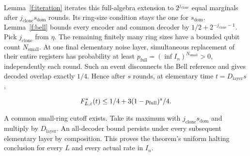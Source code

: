 Lemma~\ref{f:iteration} iterates this full-algebra extension to \(2^{j_{\mathrm{clone}}}\) equal marginals after \(j_{\mathrm{clone}} s_{\mathrm{dom}}\) rounds. Its ring-size condition stays the one for \(s_{\mathrm{dom}}\). Lemma~\ref{f:bell} bounds every encoder and common decoder by \(1/2+2^{-j_{\mathrm{clone}}-1}\). Pick \(j_{\mathrm{clone}}\) from \(\eta\). The remaining finitely many ring sizes have a bounded qubit count \(N_{\mathrm{small}}\). At one final elementary noise layer, simultaneous replacement of their entire registers has probability at least \(p_{\mathrm{full}}=(\inf  I_{n})^{N_{\mathrm{small}}}>0\), independently each round. Such an event disconnects the Bell reference and gives decoded overlap exactly \(1/4\). Hence after \(s\) rounds, at elementary time \(t=D_{\mathrm{layer}}s\),

\[
\begin{gathered}
F^*_{L,\varepsilon}(t)\le 1/4+3(1-p_{\mathrm{full}})^{s}/4.
\end{gathered}
\]

A common small-ring cutoff exists. Take its maximum with \(j_{\mathrm{clone}} s_{\mathrm{dom}}\) and multiply by \(D_{\mathrm{layer}}\). An all-decoder bound persists under every subsequent elementary layer by composition. This proves the theorem's uniform halting conclusion for every \(L\) and every actual rate in \(I_{n}\).
